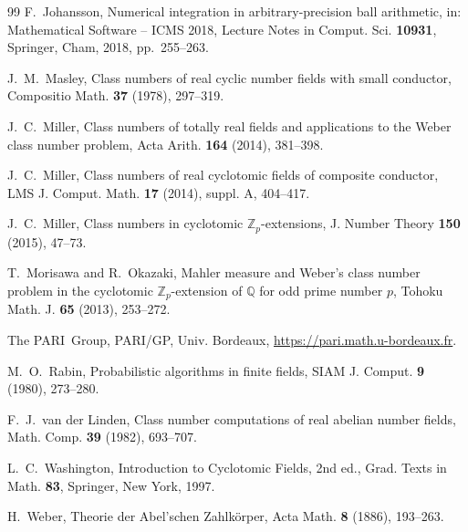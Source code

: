 \documentclass[11pt]{amsart}
\theoremstyle{plain}
\theoremstyle{definition}
\begin{document}
\begin{thebibliography}{99}
 F.~Johansson, Numerical integration in arbitrary-precision ball arithmetic, in: Mathematical Software -- ICMS 2018, Lecture Notes in Comput. Sci. \textbf{10931}, Springer, Cham, 2018, pp.~255--263.

 J.~M.~Masley, Class numbers of real cyclic number fields with small conductor, Compositio Math. \textbf{37} (1978), 297--319.

 J.~C.~Miller, Class numbers of totally real fields and applications to the Weber class number problem, Acta Arith. \textbf{164} (2014), 381--398.

 J.~C.~Miller, Class numbers of real cyclotomic fields of composite conductor, LMS J. Comput. Math. \textbf{17} (2014), suppl. A, 404--417.

 J.~C.~Miller, Class numbers in cyclotomic $\mathbb{Z}_p$-extensions, J. Number Theory \textbf{150} (2015), 47--73.

 T.~Morisawa and R.~Okazaki, Mahler measure and Weber's class number problem in the cyclotomic $\mathbb{Z}_p$-extension of $\mathbb{Q}$ for odd prime number $p$, Tohoku Math. J. \textbf{65} (2013), 253--272.

 The PARI~Group, PARI/GP, Univ. Bordeaux, \url{https://pari.math.u-bordeaux.fr}.

 M.~O.~Rabin, Probabilistic algorithms in finite fields, SIAM J. Comput. \textbf{9} (1980), 273--280.

 F.~J.~van der Linden, Class number computations of real abelian number fields, Math. Comp. \textbf{39} (1982), 693--707.

 L.~C.~Washington, Introduction to Cyclotomic Fields, 2nd ed., Grad. Texts in Math. \textbf{83}, Springer, New York, 1997.

 H.~Weber, Theorie der Abel'schen Zahlk\"orper, Acta Math. \textbf{8} (1886), 193--263.

\end{thebibliography}
\end{document}
